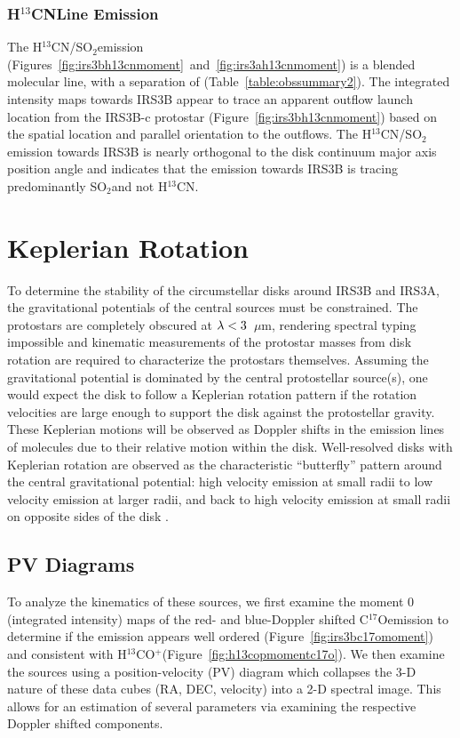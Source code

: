\documentclass[twocolumn, 12pt]{aastex63}
\newcommand{\htcn}{H$^{13}$CN}
\newcommand{\cso}{C$^{17}$O}
\newcommand{\htcop}{H$^{13}$CO$^+$}
\newcommand{\sot}{SO$_{2}$}
\renewcommand{\micron}{$\mu$m}
\newcommand{\kms}{km~s$^{-1}$}
\begin{document}
\subsubsection{\htcn\space Line Emission}\label{sec:htcnemission}
The \htcn/\sot\space emission (Figures~\ref{fig:irs3bh13cnmoment}~and~\ref{fig:irs3ah13cnmoment}) is a blended molecular line, with a separation of \deleted{1\kms}\added{1~\kms}\space(Table~\ref{table:obssummary2}). The integrated intensity maps towards IRS3B appear to trace an apparent outflow launch location from the IRS3B-c protostar (Figure~\ref{fig:irs3bh13cnmoment}) based on the spatial location and parallel orientation to the outflows. The \htcn/\sot\space emission towards IRS3B is nearly orthogonal to the disk continuum major axis position angle and indicates that the emission towards IRS3B is tracing predominantly \sot\space and not \htcn.

\section{Keplerian Rotation}\label{sec:keprotation}

To determine the stability of the circumstellar disks around IRS3B and IRS3A, the gravitational potentials of the central sources must be constrained. The protostars are completely obscured at $\lambda\space<\space3$~\micron, rendering spectral typing impossible and kinematic measurements of the protostar masses from disk rotation are required to characterize the protostars themselves. Assuming the gravitational potential is dominated by the central protostellar source(s), one would expect the disk to follow a Keplerian rotation pattern if the rotation velocities are large enough to support the disk against the protostellar gravity. These Keplerian motions will be observed as Doppler shifts in the emission lines of molecules due to their relative motion within the disk. Well-resolved disks with Keplerian rotation are observed as the characteristic ``butterfly'' pattern around the central gravitational potential: high velocity emission at small radii to low velocity emission at larger radii, and back to high velocity emission at small radii on opposite sides of the disk \citep[e.g., ][]{2013ApJ...774...16R, 2018AA...609A..47P}.

\subsection{PV Diagrams}
To analyze the kinematics of these sources, we first examine the moment 0 (integrated intensity) maps of the red- and blue-Doppler shifted \cso\space emission to determine if the emission appears well ordered (Figure~\ref{fig:irs3bc17omoment}) and consistent with \htcop\space(Figure~\ref{fig:h13copmomentc17o}). We then examine the sources using a position-velocity (PV) diagram which collapses the 3-D nature of these data cubes (RA, DEC, velocity) into a 2-D spectral image.  This allows for an estimation of several parameters via examining the respective Doppler shifted components. 
\end{document}
